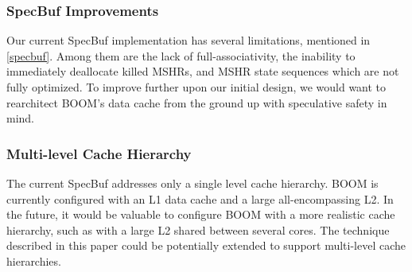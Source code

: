 \subsubsection{SpecBuf Improvements}
Our current SpecBuf implementation has several limitations, mentioned in \ref{specbuf}.
Among them are the lack of full-associativity, the inability to immediately deallocate killed MSHRs,
and MSHR state sequences which are not fully optimized.
To improve further upon our initial design, we would want to rearchitect BOOM's data cache from
the ground up with speculative safety in mind. 

\subsubsection{Multi-level Cache Hierarchy}
The current SpecBuf addresses only a single level cache hierarchy.
BOOM is currently configured with an L1 data cache and a large all-encompassing L2.
In the future, it would be valuable to configure BOOM with a more realistic cache hierarchy,
such as with a large L2 shared between several cores. The technique described in this paper
could be potentially extended to support multi-level cache hierarchies.
